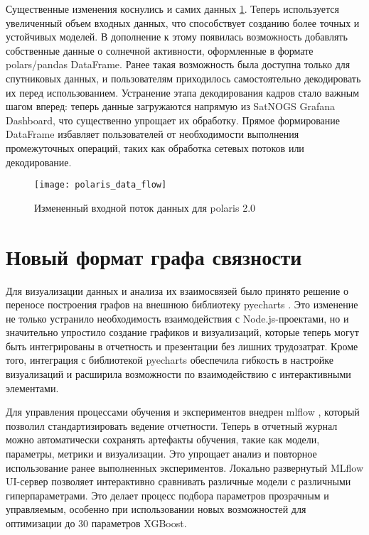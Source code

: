 Существенные изменения коснулись и самих данных \ref{fig:polaris_data_flow}. Теперь используется увеличенный объем входных данных, что способствует созданию более точных и устойчивых моделей. В дополнение к этому появилась возможность добавлять собственные данные о солнечной активности, оформленные в формате polars/pandas DataFrame. Ранее такая возможность была доступна только для спутниковых данных, и пользователям приходилось самостоятельно декодировать их перед использованием. Устранение этапа декодирования кадров стало важным шагом вперед: теперь данные загружаются напрямую из SatNOGS Grafana Dashboard, что существенно упрощает их обработку. Прямое формирование DataFrame избавляет пользователей от необходимости выполнения промежуточных операций, таких как обработка сетевых потоков или декодирование.

\begin{figure}[H]
	\centering
	\texttt{[image: polaris\_data\_flow]}
	\caption{Измененный входной поток данных для polaris 2.0}
	\label{fig:polaris_data_flow}
\end{figure}

\section{Новый формат графа связности}

Для визуализации данных и анализа их взаимосвязей было принято решение о переносе построения графов на внешнюю библиотеку pyecharts \cite{pyecharts_docs}. Это изменение не только устранило необходимость взаимодействия с Node.js-проектами, но и значительно упростило создание графиков и визуализаций, которые теперь могут быть интегрированы в отчетность и презентации без лишних трудозатрат. Кроме того, интеграция с библиотекой pyecharts обеспечила гибкость в настройке визуализаций и расширила возможности по взаимодействию с интерактивными элементами.

Для управления процессами обучения и экспериментов внедрен mlflow \cite{mlflow_docs}, который позволил стандартизировать ведение отчетности. Теперь в отчетный журнал можно автоматически сохранять артефакты обучения, такие как модели, параметры, метрики и визуализации. Это упрощает анализ и повторное использование ранее выполненных экспериментов. Локально развернутый MLflow UI-сервер позволяет интерактивно сравнивать различные модели с различными гиперпараметрами. Это делает процесс подбора параметров прозрачным и управляемым, особенно при использовании новых возможностей для оптимизации до 30 параметров XGBoost.


